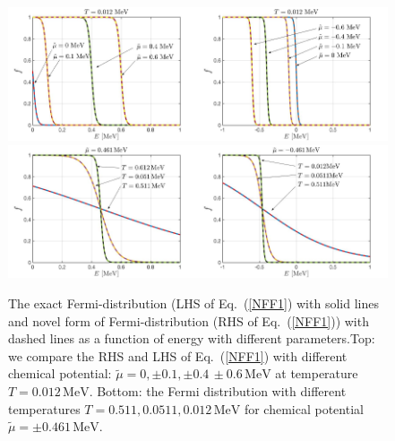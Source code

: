 \documentclass[sn-mathphys,Numbered]{sn-jnl}
\theoremstyle{thmstyleone}%
\theoremstyle{thmstyletwo}%
\theoremstyle{thmstylethree}%
\begin{document}
\begin{figure}[h]
\begin{center}
\includegraphics[width=0.5\textwidth]{./plot/Fermi_novel_001}\includegraphics[width=0.5\textwidth]{./plot/Fermi_novel_002}
\includegraphics[width=0.5\textwidth]{./plot/Fermi_novel_003}\includegraphics[width=0.5\textwidth]{./plot/Fermi_novel_004}
\caption{The exact Fermi-distribution (LHS of Eq.~(\ref{NFF1}) with solid lines and novel form of Fermi-distribution (RHS of Eq.~(\ref{NFF1})) with dashed lines as a function of energy with different parameters.Top: we compare the RHS and LHS of Eq.~(\ref{NFF1}) with different chemical potential: $\tilde\mu=0, \pm0.1, \pm0.4\,\pm0.6\, \mathrm{MeV}$ at temperature $T=0.012\,\mathrm{MeV}$. Bottom: the Fermi distribution with different temperatures $T=0.511, 0.0511, 0.012\,\mathrm{MeV}$ for chemical potential $\tilde\mu=\pm0.461\,\mathrm{MeV}$.}
\label{Fermi_Checking}
\end{center}
\end{figure}
\end{document}
